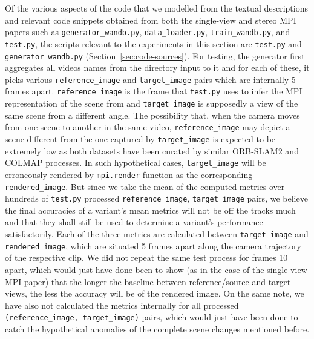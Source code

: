 Of the various aspects of the code that we modelled from the textual descriptions and relevant code snippets obtained from both the single-view and stereo MPI papers such as \texttt{generator\_wandb.py}, \texttt{data\_loader.py}, \texttt{train\_wandb.py}, and \texttt{test.py}, the scripts relevant to the experiments in this section are \texttt{test.py} and\\\texttt{generator\_wandb.py} (Section~\ref{sec:code-sources}). For testing, the generator first aggregates all videos names from the directory input to it and for each of these, it picks various \texttt{reference\_image} and \texttt{target\_image} pairs which are internally 5 frames apart. \texttt{reference\_image} is the frame that \texttt{test.py} uses to infer the MPI representation of the scene from and \texttt{target\_image} is supposedly a view of the same scene from a different angle. The possibility that, when the camera moves from one scene to another in the same video, \texttt{reference\_image} may depict a scene different from the one captured by \texttt{target\_image} is expected to be extremely low as both datasets have been curated by similar ORB-SLAM2 and COLMAP processes. In such hypothetical cases, \texttt{target\_image} will be erroneously rendered by \texttt{mpi.render} function as the corresponding \texttt{rendered\_image}. But since we take the mean of the computed metrics over hundreds of \texttt{test.py} processed \texttt{reference\_image}, \texttt{target\_image} pairs, we believe the final accuracies of a variant's mean metrics will not be off the tracks much and that they shall still be used to determine a variant’s performance satisfactorily. Each of the three metrics are calculated between \texttt{target\_image} and \texttt{rendered\_image}, which are situated 5 frames apart along the camera trajectory of the respective clip. We did not repeat the same test process for frames 10 apart, which would just have done been to show (as in the case of the single-view MPI paper) that the longer the baseline between reference/source and target views, the less the accuracy will be of the rendered image. On the same note, we have also not calculated the metrics internally for all processed \texttt{(reference\_image, target\_image)} pairs, which would just have been done to catch the hypothetical anomalies of the complete scene changes mentioned before. 

